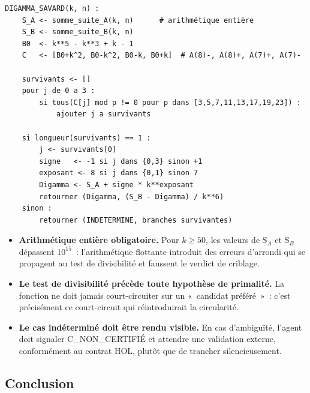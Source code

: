 \documentclass[11pt,a4paper]{article}
\newcommand{\SA}{\mathrm{S}_A}
\newcommand{\SB}{\mathrm{S}_B}
\begin{document}
\vspace{0.3cm}
\begin{boitenote}
\begin{Verbatim}[frame=single,fontsize=\footnotesize]
DIGAMMA_SAVARD(k, n) :
    S_A <- somme_suite_A(k, n)      # arithmétique entière
    S_B <- somme_suite_B(k, n)
    B0  <- k**5 - k**3 + k - 1
    C   <- [B0+k^2, B0-k^2, B0-k, B0+k]  # A(8)-, A(8)+, A(7)+, A(7)-

    survivants <- []
    pour j de 0 a 3 :
        si tous(C[j] mod p != 0 pour p dans [3,5,7,11,13,17,19,23]) :
            ajouter j a survivants

    si longueur(survivants) == 1 :
        j <- survivants[0]
        signe   <- -1 si j dans {0,3} sinon +1
        exposant <- 8 si j dans {0,1} sinon 7
        Digamma <- S_A + signe * k**exposant
        retourner (Digamma, (S_B - Digamma) / k**6)
    sinon :
        retourner (INDETERMINE, branches survivantes)
\end{Verbatim}
\end{boitenote}


\vspace{0.3cm}
\begin{boitenote}
\begin{itemize}[nosep]
  \item \textbf{Arithmétique entière obligatoire.} Pour $k \ge 50$, les
    valeurs de $\SA$ et $\SB$ dépassent $10^{15}$~: l'arithmétique
    flottante introduit des erreurs d'arrondi qui se propagent au
    test de divisibilité et faussent le verdict de criblage.
  \item \textbf{Le test de divisibilité précède toute hypothèse de
    primalité.} La fonction ne doit jamais court-circuiter sur un
    «~candidat préféré~»~: c'est précisément ce court-circuit qui
    réintroduirait la circularité.

  \item \textbf{Le cas indéterminé doit être rendu visible.} En cas
    d'ambiguïté, l'agent doit signaler \textsc{C\_NON\_CERTIFIÉ} et
    attendre une validation externe, conformément au contrat HOL,
    plutôt que de trancher silencieusement.
\end{itemize}
\end{boitenote}



\subsection{Conclusion}
\end{document}
